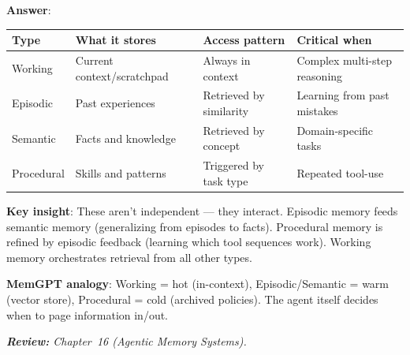 \begin{questionbox}
\textbf{Answer}:

\begin{tabular}{@{}lp{3.5cm}p{3.5cm}p{6cm}@{}}
\toprule
\textbf{Type} & \textbf{What it stores} & \textbf{Access pattern} & \textbf{Critical when} \\
\midrule
Working & Current context/scratchpad & Always in context & Complex multi-step reasoning \\
Episodic & Past experiences & Retrieved by similarity & Learning from past mistakes \\
Semantic & Facts and knowledge & Retrieved by concept & Domain-specific tasks \\
Procedural & Skills and patterns & Triggered by task type & Repeated tool-use \\
\bottomrule
\end{tabular}

\textbf{Key insight}: These aren’t independent --- they interact. Episodic memory feeds semantic memory (generalizing from episodes to facts). Procedural memory is refined by episodic feedback (learning which tool sequences work). Working memory orchestrates retrieval from all other types.

\textbf{MemGPT analogy}: Working = hot (in-context), Episodic/Semantic = warm (vector store), Procedural = cold (archived policies). The agent itself decides when to page information in/out.

\emph{\textbf{Review:} Chapter~16 (Agentic Memory Systems).}
\end{questionbox}

